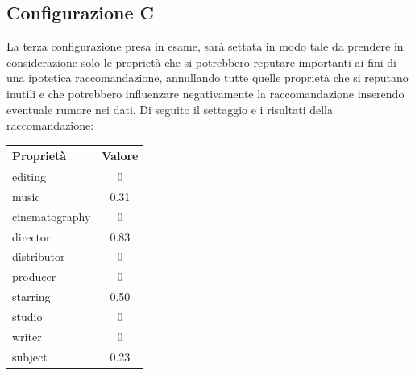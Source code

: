 \subsection{Configurazione C}
La terza configurazione presa in esame, sarà settata in modo tale da prendere in considerazione solo le proprietà che si potrebbero reputare importanti ai fini di una ipotetica raccomandazione, annullando tutte quelle proprietà che si reputano inutili e che potrebbero influenzare negativamente la raccomandazione inserendo eventuale rumore nei dati. Di seguito il settaggio e i risultati della raccomandazione:
\begin{table}[H]
	\small
	\centering
	\begin{tabular}{l c}
		Proprietà & Valore \\\hline
		editing & 0 \\
		music & 0.31 \\
		cinematography & 0\\
		director & 0.83\\
		distributor & 0\\
		producer & 0 \\
		starring & 0.50\\
		studio & 0\\
		writer & 0\\
		subject & 0.23\\
	\end{tabular}
\end{table}

